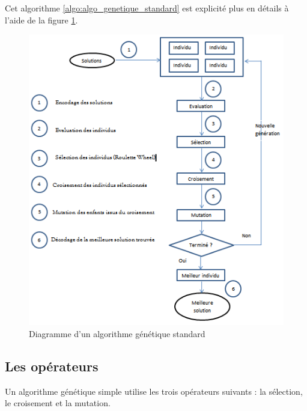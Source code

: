 	\vspace*{1cm}
	Cet algorithme \ref{algo:algo_genetique_standard} est explicité plus en détails à l'aide de la figure \ref{fig:genetic_algo_flowchart}.
	
	\begin{figure}[!h]
		\begin{center}
			\includegraphics[scale=.7]{images/genetic_algo_flowchart.png}
			\caption{Diagramme d'un algorithme génétique standard}
			\label{fig:genetic_algo_flowchart}
		\end{center}
	\end{figure}
	
	\newpage
	
	\subsection{Les opérateurs}
		Un algorithme génétique simple utilise les trois opérateurs suivants : la sélection, le croisement et la mutation.
